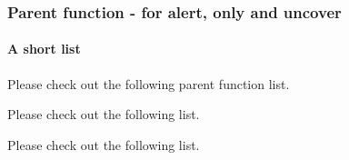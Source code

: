 \documentclass[aspectratio=169]{beamer} %
\begin{document}
\begin{frame}
    \frametitle{Parent function - for alert, only and uncover}
    \framesubtitle{A short list}
    Please check out the following \alert<2->{parent function} list.

    Please check out the following  list.

    Please check out the following  list.
\end{frame}
\end{document}
